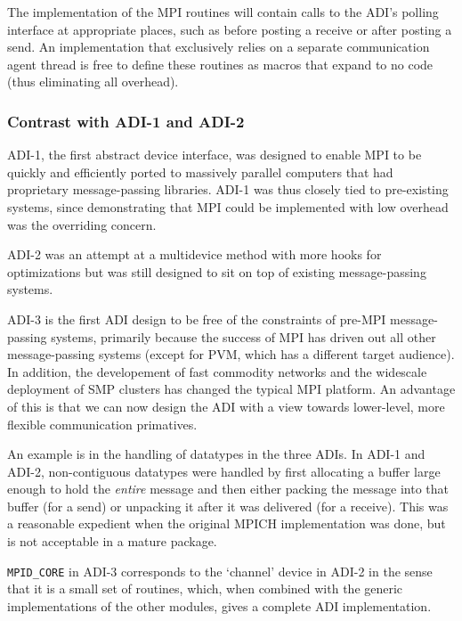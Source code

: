 \documentclass[dvipdfm]{article}
\begin{document}
The implementation of the MPI routines will contain calls to the ADI's
polling interface at appropriate places, such as before posting a
receive or after posting a send.  An implementation that exclusively
relies on a separate communication agent thread is free to define
these routines as macros that expand to no code (thus eliminating all
overhead). 

\subsubsection{Contrast with ADI-1 and ADI-2}
\label{sec-historical}

ADI-1, the first abstract device interface, was designed to enable MPI
to be quickly and efficiently ported to massively parallel computers
that had proprietary message-passing libraries.  ADI-1 was thus
closely tied to pre-existing systems, since demonstrating that MPI
could be implemented with low overhead was the overriding concern.

ADI-2 was an attempt at a multidevice method with more hooks for
optimizations but was still designed to sit on top of existing
message-passing systems.  

ADI-3 is the first ADI design to be free of the constraints of pre-MPI
message-passing systems, primarily because the success of MPI has
driven out all other message-passing systems (except for PVM, which
has a different target audience).  In addition, the developement of
fast commodity networks and the widescale deployment of SMP clusters
has changed the typical MPI platform.  An advantage of this is that we
can now design the ADI with a view towards lower-level, more flexible
communication primatives. 

An example is in the handling of datatypes in the three ADIs.
In ADI-1 and ADI-2, non-contiguous datatypes were handled by first
allocating a buffer large enough to hold the \emph{entire} message and
then either packing the message into that buffer (for a send) or
unpacking it after it was delivered (for a receive).  This was a
reasonable expedient when the original MPICH implementation was done,
but is not acceptable in a mature package.

\texttt{MPID_CORE} in ADI-3 corresponds to the `channel' device in ADI-2 in
the sense that it is a small set of routines, which, when combined with the
generic implementations of the other modules, gives a complete ADI
implementation.  
\end{document}
